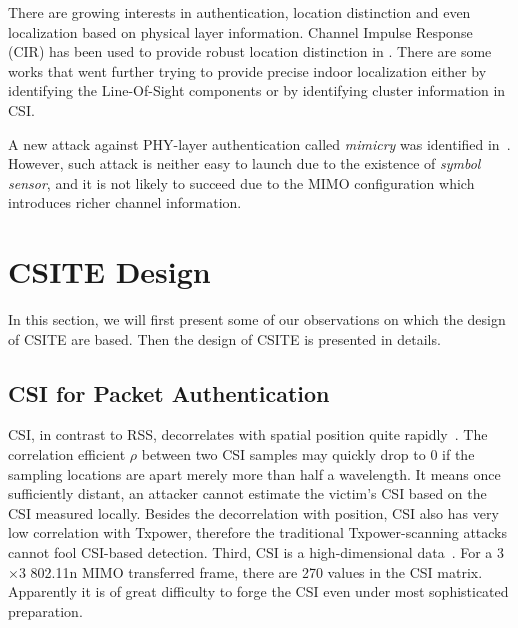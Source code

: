 \documentclass[conference]{IEEEtran}
\begin{document}
There are growing interests in authentication, location distinction and
even localization based on physical layer information. Channel
Impulse Response (CIR) has been used to provide robust location
distinction in \cite{patwari2007robust,zhang2008advancing}. There are some works
\cite{sen2012spinloc,wu2012fila,sen2012spot} that went further trying to
provide precise indoor localization either by identifying the
Line-Of-Sight components or by identifying cluster information in
CSI.

A new attack against PHY-layer authentication called \textit{mimicry} was identified
in~\cite{liu12enhanced}. However, such attack is neither easy
to launch due to the existence of \textit{symbol sensor}, and it is not likely to
succeed due to the MIMO configuration which introduces richer channel
information.



\section{CSITE Design}
\label{sec:design}

In this section, we will first present some of our observations on
 which the design of CSITE are based. Then the design of CSITE is
 presented in details.

\subsection{CSI for Packet Authentication}
 CSI, in contrast to RSS, decorrelates with spatial position quite rapidly~\cite{WCbook}. The correlation efficient $\rho$ between two CSI samples may quickly drop to $0$ if the sampling locations are apart merely more than half a wavelength. It means once sufficiently distant, an attacker cannot estimate the victim's CSI based on the CSI measured locally.
Besides the decorrelation with position, CSI also has very low correlation with Txpower, therefore the traditional Txpower-scanning attacks cannot fool CSI-based detection.
 Third, CSI is a high-dimensional data~\cite{ieee2009ieee}. For a 3$\times$3 802.11n MIMO transferred frame, there are 270 values in the CSI matrix. Apparently it is of great difficulty to forge the CSI even
 under most sophisticated preparation.
\end{document}
